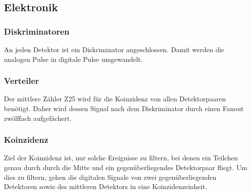 \documentclass[11pt, ngerman, fleqn, DIV=15, headinclude, BCOR=2cm]{scrreprt}
\begin{document}

\subsection{Elektronik}

\subsubsection{Diskriminatoren}

An jeden Detektor ist ein Diskriminator angeschlossen. Damit werden die
analogen Pulse in digitale Pulse umgewandelt.

\subsubsection{Verteiler}

Der mittlere Zähler Z25 wird für die Koinzidenz von allen Detektorpaaren
benötigt. Daher wird dessen Signal nach dem Diskriminator durch einen Fanout
zwölffach aufgefächert.

\subsubsection{Koinzidenz}

Ziel der Koinzidenz ist, nur solche Ereignisse zu filtern, bei denen ein
Teilchen genau durch durch die Mitte und ein gegenüberliegendes Detektorpaar
fliegt. Um dies zu filtern, gehen die digitalen Signale von zwei
gegenüberliegenden Detektoren sowie des mittleren Detektors in eine
Koinzidenzeinheit.
\end{document}
